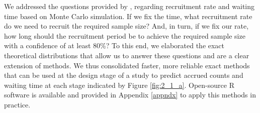 We addressed the questions provided by \cite{carter2004application}, regarding recruitment rate and waiting time based on Monte Carlo simulation. If we fix the time, what recruitment rate do we need to recruit the required sample size? And, in turn, if we fix our rate, how long should the recruitment period be to achieve the required sample size with a confidence of at least 80\%? To this end, we elaborated the exact theoretical distributions that allow us to answer these questions and are a clear extension of \cite{carter2004application} methods. We thus consolidated faster, more reliable exact methods that can be used at the design stage of a study to predict accrued counts and waiting time at each stage indicated by Figure \ref{fig:2_1_a}. Open-source R software is available and provided in Appendix \ref{appndx} to apply this methods in practice.
% 
